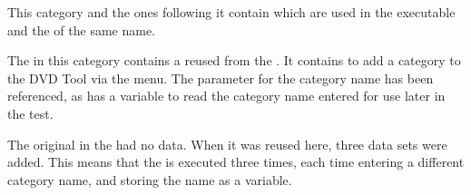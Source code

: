 
This category and the ones following it contain \gdcases{} which are used in the executable \gdcase{}  and the \gdsuite{} of the same name. 

The \gdcase{} in this category contains a reused \gdcase{} from the  \gdproject{}. It contains \gdcases{} to add a category to the DVD Tool via the menu. The parameter for the category name has been referenced, as has a variable to read the category name entered for use later in the test. 

The original \gdcase{} in the   \gdproject{} had no data. When it was reused here, three data sets were added. This means that the \gdcase{} is executed three times, each time entering a different category name, and storing the name as a variable. 
